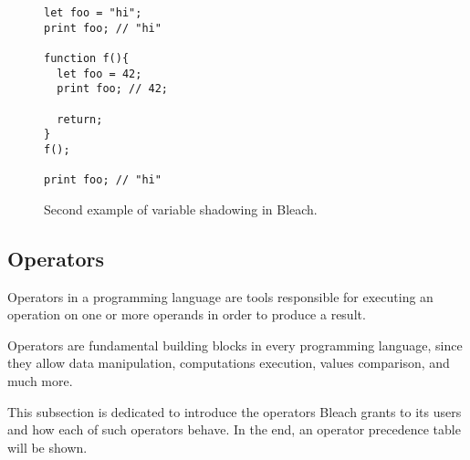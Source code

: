 \begin{figure}[H]
    \centering
    \begin{lstlisting}
let foo = "hi";
print foo; // "hi"

function f(){
  let foo = 42;
  print foo; // 42;

  return;
}
f();

print foo; // "hi"
    \end{lstlisting}
    \caption{Second example of variable shadowing in Bleach.}
\end{figure}


\subsection{Operators}
Operators in a programming language are tools responsible for executing an operation on one or more operands in order to produce a result.

Operators are fundamental building blocks in every programming language, since they allow data manipulation, computations execution, values comparison, and much more.

This subsection is dedicated to introduce the operators Bleach grants to its users and how each of such operators behave. In the end, an operator precedence table will be shown.


